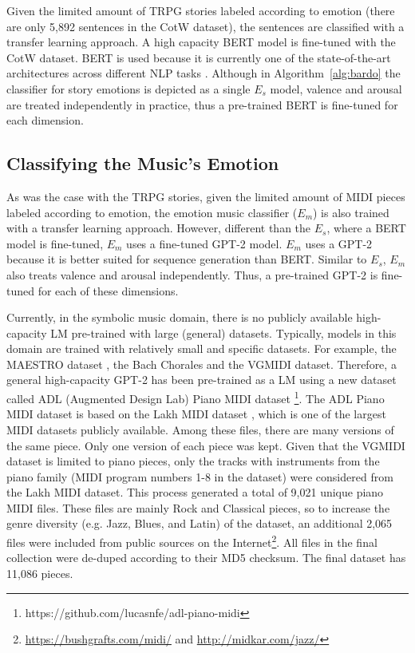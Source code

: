Given the limited amount of TRPG stories labeled according to emotion (there are only 5,892 sentences in the CotW dataset), the sentences \cite{Radford2018} are classified with a transfer learning approach. A high capacity BERT \cite{devlin2018bert} model is fine-tuned with the CotW dataset. BERT is used because it is currently one of the state-of-the-art architectures across different NLP tasks \cite{devlin2018bert}. Although in Algorithm~\ref{alg:bardo} the classifier for story emotions is depicted as a single $E_s$ model, valence and arousal are treated independently in practice, thus a pre-trained BERT is fine-tuned for each dimension.

\subsection{Classifying the Music's Emotion}

As was the case with the TRPG stories, given the limited amount of MIDI pieces labeled according to emotion, the emotion music classifier ($E_m$) is also trained with a transfer learning approach. However, different than the $E_s$, where a BERT model is fine-tuned, $E_m$ uses a fine-tuned GPT-2 model. $E_m$ uses a GPT-2 because it is better suited for sequence generation than BERT. Similar to $E_s$, $E_m$ also treats valence and arousal independently. Thus, a pre-trained GPT-2 is fine-tuned for each of these dimensions.

Currently, in the symbolic music domain, there is no publicly available high-capacity LM pre-trained with large (general) datasets. Typically, models in this domain are trained with relatively small and specific datasets. For example, the MAESTRO dataset \cite{hawthorne2018enabling}, the Bach Chorales \cite{hadjeres2017deepbach} and the VGMIDI \cite{ferreira_2019} dataset. Therefore, a general high-capacity GPT-2 has been pre-trained as a LM \cite{radford2019language} using a new dataset called ADL (Augmented Design Lab) Piano MIDI dataset \footnote{https://github.com/lucasnfe/adl-piano-midi}. The ADL Piano MIDI dataset is based on the Lakh MIDI dataset \cite{raffel2016learning}, which is one of the largest MIDI datasets publicly available. Among these files, there are many versions of the same piece. Only one version of each piece was kept. Given that the VGMIDI dataset is limited to piano pieces, only the tracks with instruments from the piano family (MIDI program numbers 1-8 in the dataset) were considered from the Lakh MIDI dataset. This process generated a total of 9,021 unique piano MIDI files. These files are mainly Rock and Classical pieces, so to increase the genre diversity (e.g. Jazz, Blues, and Latin) of the dataset, an additional 2,065 files were included from public sources on the Internet\footnote{\url{https://bushgrafts.com/midi/} and \url{http://midkar.com/jazz/}}. All files in the final collection were de-duped according to their MD5 checksum. The final dataset has 11,086 pieces.

